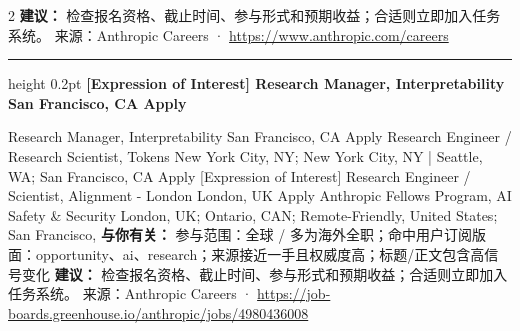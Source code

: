 \documentclass[10.5pt]{ctexart}
\begin{document}
\begin{multicols}{2}
\textbf{建议：} 检查报名资格、截止时间、参与形式和预期收益；合适则立即加入任务系统。
{\footnotesize\color{ormuted} 来源：Anthropic Careers · \url{https://www.anthropic.com/careers}}
\vspace{2mm}
\hrule height 0.2pt
\vspace{2mm}
{\large\bfseries [Expression of Interest] Research Manager, Interpretability San Francisco, CA Apply}\par
[Expression of Interest] Research Manager, Interpretability San Francisco, CA Apply Research Engineer / Research Scientist, Tokens New York City, NY; New York City, NY | Seattle, WA; San Francisco, CA Apply [Expression of Interest] Research Engineer / Scientist, Alignment - London London, UK Apply Anthropic Fellows Program, AI Safety \& Security London, UK; Ontario, CAN; Remote-Friendly, United States; San Francisco, 
\textbf{与你有关：} 参与范围：全球 / 多为海外全职；命中用户订阅版面：opportunity、ai、research；来源接近一手且权威度高；标题/正文包含高信号变化
\textbf{建议：} 检查报名资格、截止时间、参与形式和预期收益；合适则立即加入任务系统。
{\footnotesize\color{ormuted} 来源：Anthropic Careers · \url{https://job-boards.greenhouse.io/anthropic/jobs/4980436008}}
\end{multicols}
\end{document}
